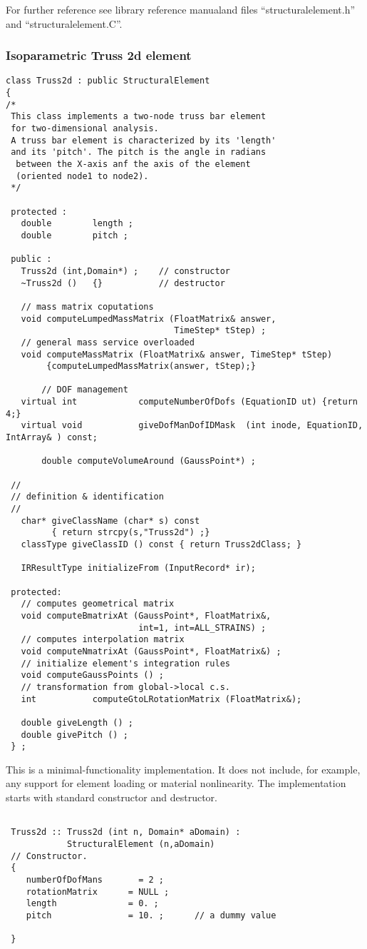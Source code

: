 \documentclass[12pt,draft]{article}
\newcommand{\file}[1]{``#1''}
\newcommand{\refman}{\oofem library reference manual}
\begin{document}
For further reference see \refman and files \file{structuralelement.h}
and \file{structuralelement.C}.

\subsubsection{Isoparametric Truss 2d element}

\begin{verbatim}
class Truss2d : public StructuralElement
{
/*
 This class implements a two-node truss bar element 
 for two-dimensional analysis.
 A truss bar element is characterized by its 'length' 
 and its 'pitch'. The pitch is the angle in radians 
  between the X-axis anf the axis of the element 
  (oriented node1 to node2).
 */

 protected :
   double        length ;
   double        pitch ;

 public :
   Truss2d (int,Domain*) ;    // constructor
   ~Truss2d ()   {}           // destructor

   // mass matrix coputations
   void computeLumpedMassMatrix (FloatMatrix& answer, 
                                 TimeStep* tStep) ;
   // general mass service overloaded 
   void computeMassMatrix (FloatMatrix& answer, TimeStep* tStep) 
        {computeLumpedMassMatrix(answer, tStep);}

       // DOF management
   virtual int            computeNumberOfDofs (EquationID ut) {return 4;}
   virtual void           giveDofManDofIDMask  (int inode, EquationID, IntArray& ) const;

       double computeVolumeAround (GaussPoint*) ;

 // 
 // definition & identification
 //
   char* giveClassName (char* s) const 
         { return strcpy(s,"Truss2d") ;}
   classType giveClassID () const { return Truss2dClass; } 

   IRResultType initializeFrom (InputRecord* ir);

 protected:
   // computes geometrical matrix 
   void computeBmatrixAt (GaussPoint*, FloatMatrix&, 
                          int=1, int=ALL_STRAINS) ;
   // computes interpolation matrix
   void computeNmatrixAt (GaussPoint*, FloatMatrix&) ;
   // initialize element's integration rules
   void computeGaussPoints () ;
   // transformation from global->local c.s.
   int           computeGtoLRotationMatrix (FloatMatrix&);

   double giveLength () ;
   double givePitch () ;
 } ;

 \end{verbatim}
 This is a minimal-functionality implementation. It does not include,
 for example, any support for element loading or material
 nonlinearity.  The implementation starts with standard constructor and
 destructor.
 \begin{verbatim}

 Truss2d :: Truss2d (int n, Domain* aDomain) : 
            StructuralElement (n,aDomain)
 // Constructor.
 {
    numberOfDofMans       = 2 ;
    rotationMatrix      = NULL ;
    length              = 0. ;
    pitch               = 10. ;      // a dummy value

 }

 \end{verbatim}
\end{document}
